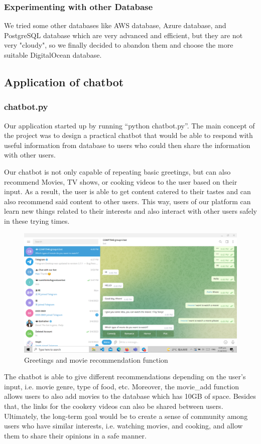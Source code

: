 \documentclass[conference]{IEEEtran}
\begin{document}
\subsubsection*{Experimenting with other Database}
We tried some other databases like AWS database, Azure database, and PostgreSQL database which are very advanced and efficient, but they are not very "cloudy", so we finally decided to abandon them and choose the more suitable DigitalOcean database.
\subsection{Application of chatbot}
\subsubsection*{chatbot.py}
Our application started up by running “python chatbot.py”. The main concept of the project was to design a practical chatbot that would be able to respond with useful information from database to users who could then share the information with other users.

Our chatbot is not only capable of repeating basic greetings, but can also recommend Movies, TV shows, or cooking videos to the user based on their input. As a result, the user is able to get content catered to their tastes and can also recommend said content to other users. This way, users of our platform can learn new things related to their interests and also interact with other users safely in these trying times.
\begin{figure}[h]
\includegraphics[scale=0.155]{8} 
\caption{Greetings and movie recommendation function}
\end{figure}

The chatbot is able to give different recommendations depending on the user’s input, i.e. movie genre, type of food, etc. Moreover, the movie\_add function allows users to also add movies to the database which has 10GB of space. Besides that, the links for the cookery videos can also be shared between users. Ultimately, the long-term goal would be to create a sense of community among users who have similar interests, i.e. watching movies, and cooking, and allow them to share their opinions in a safe manner.
\end{document}
